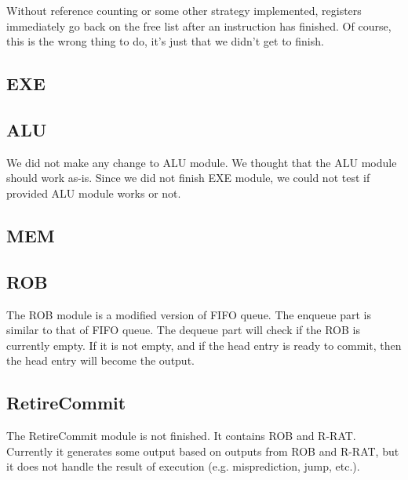 \documentclass[a4paper,11pt]{article}
\begin{document}
Without reference counting or some other strategy implemented, registers immediately go back on the free list after an instruction has finished. Of course, this is the wrong thing to do, it's just that we didn't get to finish.

\subsection{EXE}

\subsection{ALU}
We did not make any change to ALU module. We thought that the ALU module should work as-is. Since we did not finish EXE module, we could not test if provided ALU module works or not.

\subsection{MEM}

\subsection{ROB}
The ROB module is a modified version of FIFO queue. The enqueue part is similar to that of FIFO queue. The dequeue part will check if the ROB is currently empty. If it is not empty, and if the head entry is ready to commit, then the head entry will become the output.

\subsection{RetireCommit}
The RetireCommit module is not finished. It contains ROB and R-RAT. Currently it generates some output based on outputs from ROB and R-RAT, but it does not handle the result of execution (e.g. misprediction, jump, etc.).
\end{document}
